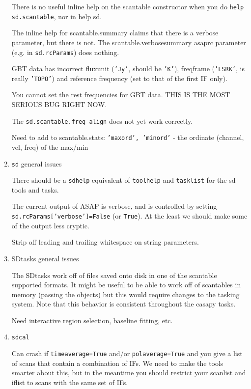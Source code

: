 \begin{enumerate}
  There is no useful inline help on the scantable constructor
  when you do {\tt help sd.scantable}, nor in {help sd}.

  The inline help for scantable.summary claims that there is
  a verbose parameter, but there is not.  The scantable.verbosesummary
  asaprc parameter (e.g. in {\tt sd.rcParams}) does nothing.

  GBT data has incorrect fluxunit ({\tt 'Jy'}, should be {\tt 'K'}), 
  freqframe ({\tt 'LSRK'}, is really {\tt 'TOPO'}) and reference
  frequency (set to that of the first IF only).

  You cannot set the rest frequencies for GBT data.
  THIS IS THE MOST SERIOUS BUG RIGHT NOW.

  The {\tt sd.scantable.freq\_align} does not yet work correctly.

  Need to add to scantable.stats:
      {\tt 'maxord', 'minord'} - the ordinate (channel, vel, freq) 
      of the max/min
  
\item {\tt sd} general issues

  There should be a {\tt sdhelp} equivalent of {\tt toolhelp}
  and {\tt tasklist} for the sd tools and tasks.

  The current output of ASAP is verbose, and is controlled by
  setting {\tt sd.rcParams['verbose']=False} (or {\tt True}).
  At the least we should make some of the output less cryptic.

  Strip off leading and trailing whitespace on string parameters.

\item SDtasks general issues

  The SDtasks work off of files saved onto disk in one of the 
  scantable supported formats.  It might be useful to be able to
  work off of scantables in memory (passing the objects) but this
  would require changes to the tasking system.  Note that this
  behavior is consistent throughout the casapy tasks.

  Need interactive region selection, baseline fitting, etc.

\item {\tt sdcal}

  Can crash if {\tt timeaverage=True} and/or {\tt polaverage=True}
  and you give a
  list of scans that contain a combination of IFs.  We need to make
  the tools smarter about this, but in the meantime you should restrict
  your scanlist and iflist to scans with the same set of IFs.


\end{enumerate}
